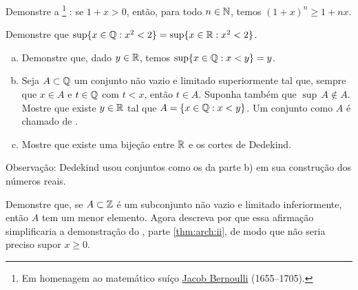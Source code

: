 \begin{exercise} \label{exercise:bernoulliineq}
Demonstre a \emph{}%
\footnote{%
Em homenagem ao matemático suíço
\href{https://en.wikipedia.org/wiki/Jacob_Bernoulli}{Jacob Bernoulli}
(1655--1705).}%
: se $1+x > 0$, então,
para todo $n \in {\mathbb{N}}$, temos $(1+x)^n \geq 1+nx$.
\end{exercise}

\begin{exercise} \label{exercise:sqrt2QorR}
Demonstre que $\sup \{ x \in {\mathbb{Q}} : x^2 < 2 \} = \sup \{ x \in {\mathbb{R}} : x^2 < 2 \}$.
\end{exercise}

\begin{exercise} \label{exercise:Dedekind}
\leavevmode
\begin{enumerate}[a)]
\item
Demonstre que, dado $y \in {\mathbb{R}}$, temos $\sup \{ x \in {\mathbb{Q}} : x < y \} = y$.
\item
Seja $A \subset {\mathbb{Q}}$ um conjunto não vazio e limitado superiormente tal que, sempre que $x
\in A$ e $t \in {\mathbb{Q}}$ com $t < x$, então $t \in A$. Suponha também
que $\sup\, A \notin A$. Mostre que existe $y \in {\mathbb{R}}$ tal que
$A = \{ x \in {\mathbb{Q}} : x < y \}$. Um conjunto como $A$ é chamado de
\emph{}.
\item
Mostre que existe uma bijeção entre ${\mathbb{R}}$ e os cortes de Dedekind.
\end{enumerate}
Observação: Dedekind usou conjuntos como os da parte b) em sua construção dos
números reais.
\end{exercise}

\begin{exercise}
Demonstre que, se $A \subset {\mathbb{Z}}$ é um subconjunto não vazio e limitado inferiormente, então
$A$ tem um menor elemento.
Agora descreva por que essa afirmação simplificaria a demonstração do
, parte \ref{thm:arch:ii}, de modo que não seria preciso supor
$x \geq 0$.
\end{exercise}

